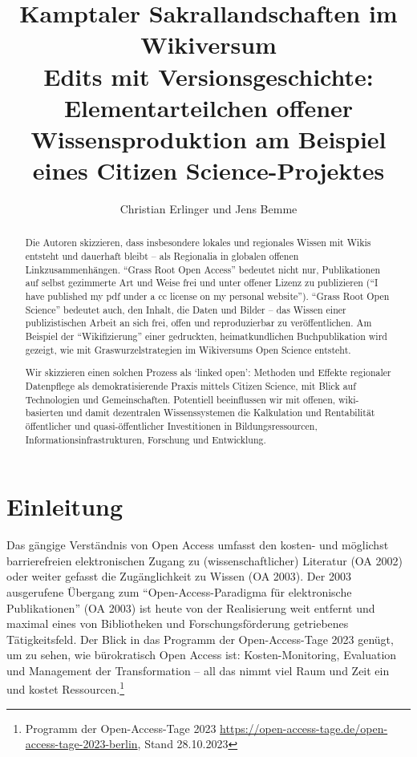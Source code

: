 \documentclass[a4paper,
fontsize=11pt,
oneside,
numbers=noperiodatend,
parskip=half-,
bibliography=totoc,
final
]{scrartcl}
\title{\LARGE{Kamptaler Sakrallandschaften im Wikiversum}\\ \large{Edits mit Versionsgeschichte: Elementarteilchen offener Wissensproduktion am Beispiel eines Citizen Science-Projektes}}%
\author{Christian Erlinger und Jens Bemme} %
\date{}
\begin{document}
\maketitle
\thispagestyle{fancyplain} 

\begin{abstract}
\noindent
Die Autoren skizzieren, dass insbesondere lokales und regionales Wissen
mit Wikis entsteht und dauerhaft bleibt -- als Regionalia in globalen
offenen Linkzusammenhängen. ``Grass Root Open Access'' bedeutet nicht
nur, Publikationen auf selbst gezimmerte Art und Weise frei und unter
offener Lizenz zu publizieren (``I have published my pdf under a cc
license on my personal website''). ``Grass Root Open Science'' bedeutet
auch, den Inhalt, die Daten und Bilder -- das Wissen einer
publizistischen Arbeit an sich frei, offen und reproduzierbar zu
veröffentlichen. Am Beispiel der ``Wikifizierung'' einer gedruckten,
heimatkundlichen Buchpublikation wird gezeigt, wie mit
Graswurzelstrategien im Wikiversums Open Science entsteht.

Wir skizzieren einen solchen Prozess als `linked open': Methoden und
Effekte regionaler Datenpflege als demokratisierende Praxis mittels
Citizen Science, mit Blick auf Technologien und Gemeinschaften.
Potentiell beeinflussen wir mit offenen, wiki-basierten und damit
dezentralen Wissenssystemen die Kalkulation und Rentabilität
öffentlicher und quasi-öffentlicher Investitionen in Bildungsressourcen,
Informationsinfrastrukturen, Forschung und Entwicklung.
\end{abstract}

\hypertarget{einleitung}{%
\section{Einleitung}\label{einleitung}}

Das gängige Verständnis von Open Access umfasst den kosten- und
möglichst barrierefreien elektronischen Zugang zu (wissenschaftlicher)
Literatur (OA 2002) oder weiter gefasst die Zugänglichkeit zu Wissen (OA
2003). Der 2003 ausgerufene Übergang zum \enquote{Open-Access-Pa\-ra\-dig\-ma
für elektronische Publikationen} (OA 2003) ist heute von der
Realisierung weit entfernt und maximal eines von Bibliotheken und
Forschungsförderung getriebenes Tätigkeitsfeld. Der Blick in das
Programm der Open-Access-Tage 2023 genügt, um zu sehen, wie bürokratisch
Open Access ist: Kosten-Monitoring, Evaluation und Management der
Transformation -- all das nimmt viel Raum und Zeit ein und kostet
Ressourcen.\footnote{Programm der Open-Access-Tage 2023
  \url{https://open-access-tage.de/open-access-tage-2023-berlin}, Stand
  28.10.2023}
\end{document}
